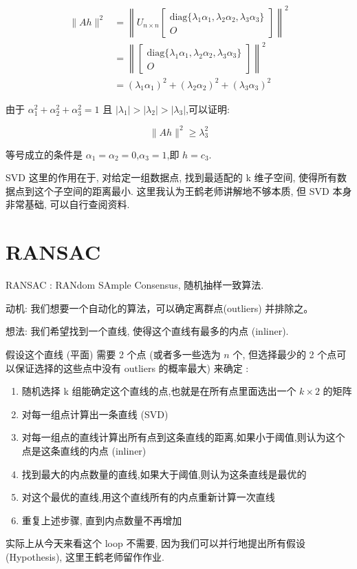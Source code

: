 $$
\begin{aligned}
\|Ah\|^2 &= \left\| U_{n \times n} \begin{bmatrix} \text{diag}\{\lambda_1 \alpha_1, \lambda_2 \alpha_2, \lambda_3 \alpha_3\} \\ O \end{bmatrix} \right\|^2 \\
&= \left\| \begin{bmatrix} \text{diag}\{\lambda_1 \alpha_1, \lambda_2 \alpha_2, \lambda_3 \alpha_3\} \\ O \end{bmatrix} \right\|^2 \\
&= (\lambda_1 \alpha_1)^2 + (\lambda_2 \alpha_2)^2 + (\lambda_3 \alpha_3)^2
\end{aligned}
$$

由于 $\alpha_1^2 + \alpha_2^2 + \alpha_3^2 = 1$ 且 $|\lambda_1| > |\lambda_2| > |\lambda_3|$,可以证明:

$$
\|Ah\|^2 \geq \lambda_3^2
$$

等号成立的条件是 $\alpha_1 = \alpha_2 = 0$,$\alpha_3 = 1$,即 $h = c_3$.

SVD 这里的作用在于, 对给定一组数据点, 找到最适配的 k 维子空间, 使得所有数据点到这个子空间的距离最小. 这里我认为王鹤老师讲解地不够本质, 但 SVD 本身非常基础, 可以自行查阅资料.

\section{RANSAC}

RANSAC : RANdom SAmple Consensus, 随机抽样一致算法.

动机: 我们想要一个自动化的算法，可以确定离群点(outliers) 并排除之。

想法: 我们希望找到一个直线, 使得这个直线有最多的内点 (inliner).

\begin{definition}
    假设这个直线 (平面) 需要 2 个点 (或者多一些选为 $n$ 个, 但选择最少的 2 个点可以保证选择的这些点中没有 outliers 的概率最大) 来确定 : 

    \begin{enumerate}
        \item 随机选择 k 组能确定这个直线的点,也就是在所有点里面选出一个 $k\times 2$ 的矩阵
        \item 对每一组点计算出一条直线 (SVD)
        \item 对每一组点的直线计算出所有点到这条直线的距离,如果小于阈值,则认为这个点是这条直线的内点 (inliner)
        \item 找到最大的内点数量的直线,如果大于阈值,则认为这条直线是最优的
        \item 对这个最优的直线,用这个直线所有的内点重新计算一次直线
        \item 重复上述步骤, 直到内点数量不再增加
    \end{enumerate}
    
\end{definition}
\begin{note}
    实际上从今天来看这个 loop 不需要, 因为我们可以并行地提出所有假设 (Hypothesis), 这里王鹤老师留作作业.
\end{note}

